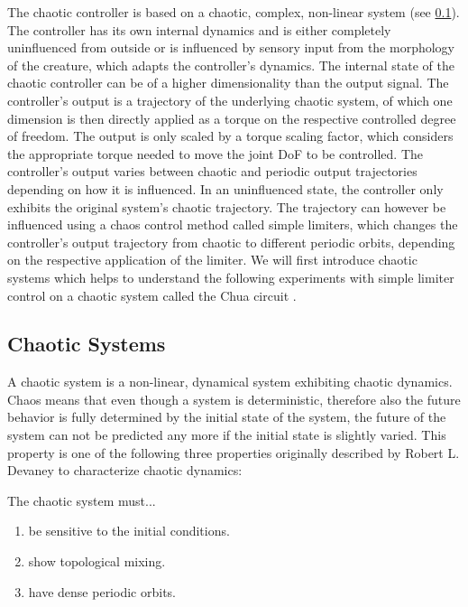 \documentclass[main]{subfiles}
\begin{document}
The chaotic controller is based on a chaotic, complex, non-linear system (see \ref{subsec:chaotic-systems}). %
%
The controller has its own internal dynamics and is either completely uninfluenced from outside or is influenced by sensory input from the morphology of the creature, which adapts the controller's dynamics. %
%
The internal state of the chaotic controller can be of a higher dimensionality than the output signal.%
%
The controller's output is a trajectory of the underlying chaotic system, of which one dimension is then directly applied as a torque on the respective controlled degree of freedom. %
%
The output is only scaled by a torque scaling factor, which considers the appropriate torque needed to move the joint DoF to be controlled. %
%
The controller's output varies between chaotic and periodic output trajectories depending on how it is influenced. %
%
In an uninfluenced state, the controller only exhibits the original system's chaotic trajectory. %
%
The trajectory can however be influenced using a chaos control method called simple limiters, which changes the controller's output trajectory from chaotic to different periodic orbits, depending on the respective application of the limiter. %
%
We will first introduce chaotic systems which helps to understand the following experiments with simple limiter control on a chaotic system called the Chua circuit \cite{bib:Matsumoto1985}.

\subsection{Chaotic Systems}
\label{subsec:chaotic-systems}

A chaotic system is a non-linear, dynamical system exhibiting chaotic dynamics. %
%
Chaos means that even though a system is deterministic, therefore also the future behavior is fully determined by the initial state of the system, the future of the system can not be predicted any more if the initial state is slightly varied. %
%
This property is one of the following three properties originally described by Robert L. Devaney \cite{bib:Devaney1989} to characterize chaotic dynamics:

The chaotic system must...
\begin{enumerate}
\item be sensitive to the initial conditions.
\item show topological mixing.
\item have dense periodic orbits.
\end{enumerate}
\end{document}
